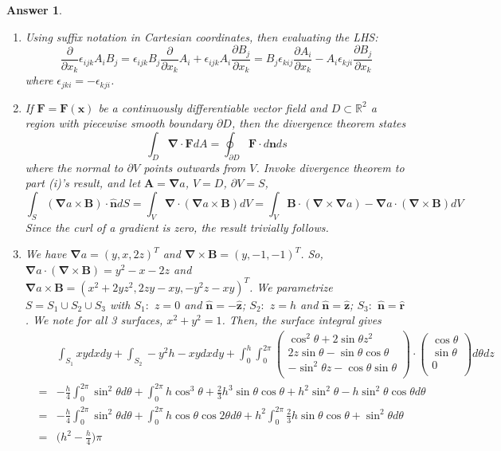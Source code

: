 \documentclass[a4paper]{article}
\newtheorem{ans}{Answer}[section]
\theoremstyle{new}
\begin{document}
\begin{ans}\leavevmode
\begin{enumerate}[label=(\roman*)]
    \item Using suffix notation in Cartesian coordinates, then evaluating the LHS:
$$\frac{\partial}{\partial x_k}\epsilon_{ijk}A_iB_j=\epsilon_{ijk}B_j\frac{\partial}{\partial x_k}A_i+\epsilon_{ijk}A_i\frac{\partial B_j}{\partial x_k}=B_j\epsilon_{kij}\frac{\partial A_i}{\partial x_k}-A_i\epsilon_{kji}\frac{\partial B_j}{\partial x_k}$$
 where $\epsilon_{jki}=-\epsilon_{kji}$.
\item If $\mathbf{F}=\mathbf{F}(\mathbf{x})$ be a continuously differentiable vector field and $D\subset\mathbb{R}^2$ a region with piecewise smooth boundary $\partial D$, then the divergence theorem states
$$ \int_D\boldsymbol{\nabla}\cdot\mathbf{F}dA=\oint_{\partial D}\mathbf{F}\cdot d\mathbf{n}ds$$
where the normal to $\partial V$ points outwards from $V$. Invoke divergence theorem to part (i)'s result, and let $\mathbf{A}=\boldsymbol{\nabla}a$, $V=D$, $\partial V=S$,
$$\int_S(\boldsymbol{\nabla}a\times\mathbf{B})\cdot\mathbf{\hat{n}}dS=\int_V\boldsymbol{\nabla}\cdot(\boldsymbol{\nabla}a\times\mathbf{B})dV=\int_V\mathbf{B}\cdot(\boldsymbol{\nabla}\times\boldsymbol{\nabla}a)-\boldsymbol{\nabla}a\cdot(\boldsymbol{\nabla}\times\mathbf{B})dV$$
Since the curl of a gradient is zero, the result trivially follows.
\item We have $\boldsymbol{\nabla}a=(y,x,2z)^T$ and $\boldsymbol{\nabla}\times\mathbf{B}=(y,-1,-1)^T$. So, $\boldsymbol{\nabla}a\cdot(\boldsymbol{\nabla}\times\mathbf{B})=y^2-x-2z$ and $\boldsymbol{\nabla}a\times\mathbf{B}=(x^2+2yz^2,2zy-xy,-y^2z-xy)^T$. We parametrize $S=S_1\cup S_2\cup S_3$ with $S_1:$ $z=0$ and $\mathbf{\hat{n}}=-\mathbf{\hat{z}}$; $S_2:$ $z=h$ and $\mathbf{\hat{n}}=\mathbf{\hat{z}}$; $S_3:$ $\mathbf{\hat{n}}=\mathbf{\hat{r}}$. We note for all 3 surfaces, $x^2+y^2=1$. Then, the surface integral gives
\begin{eqnarray}
&&\int_{S_1}xydxdy+\int_{S_2}-y^2h-xydxdy+\int_0^h\int_0^{2\pi}\begin{pmatrix}\cos^2\theta+2\sin\theta z^2\\2z\sin\theta-\sin\theta\cos\theta\\-\sin^2\theta z-\cos\theta\sin\theta\\\end{pmatrix}\cdot\begin{pmatrix}\cos\theta\\\sin\theta\\0\\\end{pmatrix}d\theta dz\nonumber\\&=&-\frac{h}{4}\int_0^{2\pi}\sin^2\theta d\theta+\int_0^{2\pi}h\cos^3\theta+\frac{2}{3}h^3\sin\theta\cos\theta+h^2\sin^2\theta-h\sin^2\theta\cos\theta d\theta\nonumber\\&=&-\frac{h}{4}\int_0^{2\pi}\sin^2\theta d\theta+\int_0^{2\pi}h\cos\theta\cos2\theta d\theta+h^2\int_0^{2\pi}\frac{2}{3}h\sin\theta\cos\theta+\sin^2\theta d\theta\nonumber\\&=& \bigg(h^2-\frac{h}{4}\bigg)\pi\nonumber

\end{eqnarray}
\end{enumerate}
\end{ans}
\end{document}
